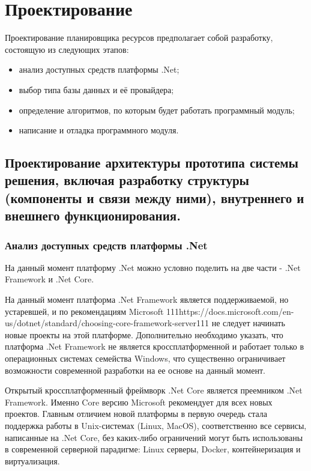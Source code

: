 \section{Проектирование}

Проектирование планировщика ресурсов предполагает собой разработку, состоящую из следующих этапов:
\begin{itemize}
	\item анализ доступных средств платформы .Net;
	\item выбор типа базы данных и её провайдера;
	\item определение алгоритмов, по которым будет работать программный модуль;
	\item написание и отладка программного модуля.
\end{itemize}


\subsection{Проектирование архитектуры прототипа системы решения, включая разработку структуры (компоненты и связи между ними), внутреннего и внешнего функционирования.}

\subsubsection{Анализ доступных средств платформы .Net}

На данный момент платформу .Net можно условно поделить на две части - .Net Framework и .Net Core.

На данный момент платформа .Net Framework является поддерживаемой, но устаревшей, и по рекомендациям Microsoft 111https://docs.microsoft.com/en-us/dotnet/standard/choosing-core-framework-server111 не следует начинать новые проекты на этой платформе. Дополнительно необходимо указать, что платформа .Net Framework не является кроссплатформенной и работает только в операционных системах семейства Windows, что существенно ограничивает возможности современной разработки на ее основе на данный момент.

Открытый кроссплатформенный фреймворк .Net Core является преемником .Net Framework. Именно Core версию Microsoft рекомендует для всех новых проектов. Главным отличием новой платформы в первую очередь стала поддержка работы в Unix-системах (Linux, MacOS), соответственно все сервисы, написанные на .Net Core, без каких-либо ограничений могут быть использованы в современной серверной парадигме: Linux серверы, Docker, контейнеризация и виртуализация.

